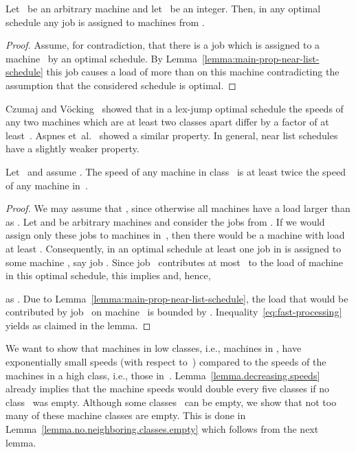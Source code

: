 \documentclass[a4paper,11pt,fleqn]{article}
\begin{document}
\begin{cor}
\label{corol.optimal.assignment}
Let~ be an arbitrary machine and let~ be an integer. Then, in any optimal schedule any job  is assigned to machines from .
\end{cor}

\begin{proof}
Assume, for contradiction, that there is a job  which is assigned to a machine~ by an optimal schedule. By Lemma~\ref{lemma:main-prop-near-list-schedule} this job causes a load of more than  on this machine contradicting the assumption that the considered schedule is optimal.
\end{proof}

Czumaj and V\"{o}cking~\cite{Voecking:2007} showed that in a lex-jump optimal
schedule the speeds of any two machines which are at least two classes apart
differ by a factor of at least~. Aspnes et~al.~\cite{DBLP:journals/jacm/AspnesAFPW97} showed a similar property. In general, near list schedules have a
slightly weaker property. 

\begin{lemma}
\label{lemma.decreasing.speeds}
Let~ and assume . The speed of any machine in
class~ is at least twice the speed of any machine in~.
\end{lemma}


\begin{proof}
We may assume that , since otherwise all machines have a load larger than  as . Let  and  be arbitrary machines and consider the jobs from . If we would assign only these jobs to machines in~, then
there would be a machine with load at least . Consequently, in an optimal schedule at least one job in  is assigned to some machine , say job . Since job~ contributes at most~ to the load of machine~ in this optimal schedule, this implies  and, hence,

as .
Due to Lemma~\ref{lemma:main-prop-near-list-schedule}, the load that would be contributed by job~ on machine~ is bounded by . Inequality~\eqref{eq:fast-processing} yields  as claimed in the lemma.
\end{proof}

We want to show that machines in low classes, i.e., machines in , have exponentially small speeds
(with respect to~) compared to the speeds of the machines in a high class, i.e., those in~.
Lemma~\ref{lemma.decreasing.speeds} already implies that the machine speeds
would double every five classes if no class~ was empty. Although some classes~ can be empty,
we show that not too many of these machine classes are empty. This is done in Lemma~\ref{lemma.no.neighboring.classes.empty}
which follows from the next lemma.
\end{document}
